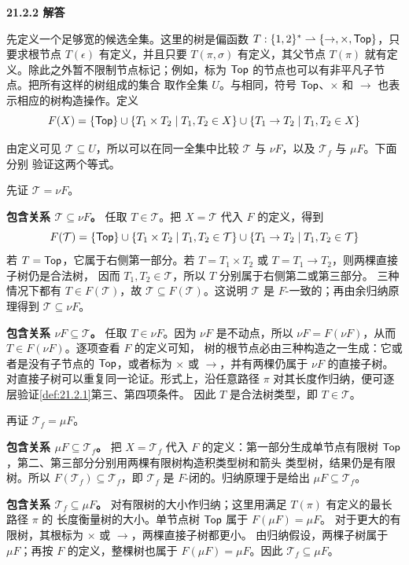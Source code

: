 \begin{taplauthorsolutionentrybox}
\label{sol:author:21.2.2}
\textbf{21.2.2 解答}

先定义一个足够宽的候选全集。这里的树是偏函数
\(T:\{1,2\}^{*}\rightharpoonup\{\to,\times,\mathsf{Top}\}\)，只要求根节点
\(T(\epsilon)\) 有定义，并且只要 \(T(\pi,\sigma)\) 有定义，其父节点
\(T(\pi)\) 就有定义。除此之外暂不限制节点标记；例如，标为
\(\mathsf{Top}\) 的节点也可以有非平凡子节点。把所有这样的树组成的集合
取作全集 \(U\)。与相同，符号
\(\mathsf{Top}\)、\(\times\) 和 \(\to\) 也表示相应的树构造操作。定义
\[
F(X)=\{\mathsf{Top}\}
\cup\{T_1\times T_2\mid T_1,T_2\in X\}
\cup\{T_1\to T_2\mid T_1,T_2\in X\}
\]

由定义可见 \(\mathcal T\subseteq U\)，所以可以在同一全集中比较
\(\mathcal T\) 与 \(\nu F\)，以及 \(\mathcal T_f\) 与 \(\mu F\)。下面分别
验证这两个等式。

先证 \(\mathcal T=\nu F\)。

\textbf{包含关系 \(\mathcal T\subseteq\nu F\)。}
任取 \(T\in\mathcal T\)。把 \(X=\mathcal T\) 代入 \(F\) 的定义，得到
\[
F(\mathcal T)=\{\mathsf{Top}\}
\cup\{T_1\times T_2\mid T_1,T_2\in\mathcal T\}
\cup\{T_1\to T_2\mid T_1,T_2\in\mathcal T\}
\]
若 \(T=\mathsf{Top}\)，它属于右侧第一部分。若
\(T=T_1\times T_2\) 或 \(T=T_1\to T_2\)，则两棵直接子树仍是合法树，
因而 \(T_1,T_2\in\mathcal T\)，所以 \(T\) 分别属于右侧第二或第三部分。
三种情况下都有 \(T\in F(\mathcal T)\)，故
\(\mathcal T\subseteq F(\mathcal T)\)。这说明 \(\mathcal T\) 是
\(F\)-一致的；再由余归纳原理得到
\(\mathcal T\subseteq\nu F\)。

\textbf{包含关系 \(\nu F\subseteq\mathcal T\)。}
任取 \(T\in\nu F\)。因为 \(\nu F\) 是不动点，所以
\(\nu F=F(\nu F)\)，从而 \(T\in F(\nu F)\)。逐项查看 \(F\) 的定义可知，
树的根节点必由三种构造之一生成：它或者是没有子节点的
\(\mathsf{Top}\)，或者标为 \(\times\) 或 \(\to\)，并有两棵仍属于
\(\nu F\) 的直接子树。对直接子树可以重复同一论证。形式上，沿任意路径
\(\pi\) 对其长度作归纳，便可逐层验证\cref{def:21.2.1}第三、第四项条件。
因此 \(T\) 是合法树类型，即 \(T\in\mathcal T\)。

再证 \(\mathcal T_f=\mu F\)。

\textbf{包含关系 \(\mu F\subseteq\mathcal T_f\)。}
把 \(X=\mathcal T_f\) 代入 \(F\) 的定义：第一部分生成单节点有限树
\(\mathsf{Top}\)，第二、第三部分分别用两棵有限树构造积类型树和箭头
类型树，结果仍是有限树。所以
\(F(\mathcal T_f)\subseteq\mathcal T_f\)，即 \(\mathcal T_f\) 是
\(F\)-闭的。归纳原理于是给出
\(\mu F\subseteq\mathcal T_f\)。

\textbf{包含关系 \(\mathcal T_f\subseteq\mu F\)。}
对有限树的大小作归纳；这里用满足 \(T(\pi)\) 有定义的最长路径 \(\pi\) 的
长度衡量树的大小。单节点树 \(\mathsf{Top}\) 属于 \(F(\mu F)=\mu F\)。
对于更大的有限树，其根标为 \(\times\) 或 \(\to\)，两棵直接子树都更小。
由归纳假设，两棵子树属于 \(\mu F\)；再按 \(F\) 的定义，整棵树也属于
\(F(\mu F)=\mu F\)。因此 \(\mathcal T_f\subseteq\mu F\)。

\end{taplauthorsolutionentrybox}

